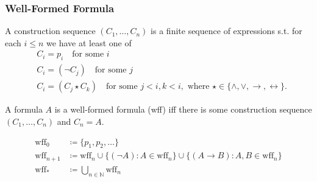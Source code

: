 \documentclass[UTF8,11pt,colorlinks,compress,openany]{beamer}%
\begin{document}
\begin{frame}\frametitle{Well-Formed Formula}
\setlength\abovedisplayskip{0pt}
\setlength\belowdisplayskip{0pt}
	\begin{definition}
		A construction sequence $(C_1,\dots, C_n)$ is a finite sequence of expressions s.t. for each $i\leq n$ we have at least one of 
		\begin{align*}
		&C_i=p_i\quad\text{for some $i$}\\
		&C_i=(\neg C_j)\quad\text{for some $j$}\\
		&C_i=(C_j\star C_k)\quad\text{for some $j<i, k<i$}, \mbox{ where }\star\in\{\wedge,\vee,\to,\leftrightarrow\}.
		\end{align*}
	\end{definition}
	\begin{definition}
	A formula $A$ is a well-formed formula (wff) iff there is some construction sequence $(C_1,\dots, C_n)$ and $C_n=A$.
	\end{definition}\vspace*{-3ex}
\begin{align*}
\mathrm{wff}_0&\coloneqq \{p_1,p_2,\dots\}\\
\mathrm{wff}_{n+1}&\coloneqq \mathrm{wff}_n\cup\big\{(\neg A): A\in\mathrm{wff}_n\big\}\cup\big\{(A\to B): A, B\in\mathrm{wff}_n\big\}\\
\mathrm{wff}_*&\coloneqq \bigcup\limits_{n\in\mathbb{N}}\mathrm{wff}_n
\end{align*}
\end{frame}
\end{document}
